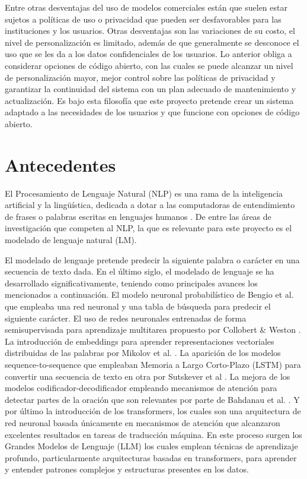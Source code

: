 Entre otras desventajas del uso de modelos comerciales están que suelen estar
sujetos a políticas de uso o privacidad que pueden ser desfavorables para las
instituciones y los usuarios. Otras desventajas son las variaciones de su costo,
el nivel de personalización es limitado, además de que generalmente se desconoce
el uso que se les da a los datos confidenciales de los usuarios. Lo anterior
obliga a considerar opciones de código abierto, con las cuales se puede alcanzar
un nivel de personalización mayor, mejor control sobre las políticas de privacidad
y garantizar la continuidad del sistema con un plan adecuado de mantenimiento
y actualización. Es bajo esta filosofía que este proyecto pretende crear un sistema
adaptado a las necesidades de los usuarios y que funcione con opciones de código
abierto.

\section{Antecedentes}

El Procesamiento de Lenguaje Natural (NLP) es una rama de la inteligencia artificial
y la lingüística, dedicada a dotar a las computadoras de entendimiento de frases o
palabras escritas en lenguajes humanos \cite{khurana_natural_2023}. De entre las áreas
de investigación que competen al NLP, la que es relevante para este proyecto es
el modelado de lenguaje natural (LM).

El modelado de lenguaje pretende predecir la siguiente palabra o carácter en una
secuencia de texto dada. En el último siglo, el modelado de lenguaje se ha
desarrollado significativamente, teniendo como principales avances los mencionados
a continuación. El modelo neuronal probabilístico de Bengio et al. \cite{bengio_neural_2003}
que empleaba una red neuronal y una tabla de búsqueda para predecir el siguiente carácter.
El uso de redes neuronales entrenadas de forma semisupervisada para aprendizaje
multitarea propuesto por Collobert \& Weston \cite{collobert_unified_2008}. La
introducción de embeddings para aprender representaciones vectoriales distribuidas
de las palabras por Mikolov et al. \cite{mikolov_distributed_2013}.
La aparición de los modelos sequence-to-sequence que empleaban Memoria a
Largo Corto-Plazo (LSTM) para convertir una secuencia de texto en otra por
Sutskever et al \cite{sutskever_sequence_2014}. La mejora de los modelos
codificador-decodificador empleando mecanismos de atención para detectar partes de la
oración que son relevantes por parte de Bahdanau et al. \cite{bahdanau_neural_2016}.
Y por último la introducción de los transformers, los cuales
son una arquitectura de red neuronal basada únicamente en mecanismos de atención
\cite{vaswani_attention_2017} que alcanzaron excelentes resultados en tareas de traducción
máquina. En este proceso surgen los Grandes Modelos de Lenguaje (LLM) los cuales
emplean técnicas de aprendizaje profundo, particularmente arquitecturas basadas
en transformers, para aprender y entender patrones complejos y estructuras presentes
en los datos.

